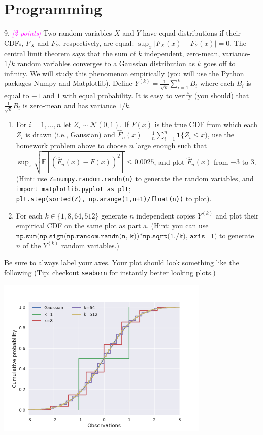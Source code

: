 \documentclass{article}
\newcommand{\1}{\mathbf{1}}
\newcommand{\E}{\mathbb{E}}
\newcommand{\grade}[1]{\small\textcolor{magenta}{\emph{[#1 points]}} \normalsize}
\begin{document}
{\color{blue}

\section{Programming}

9. \grade{2} Two random variables $X$ and $Y$ have equal distributions if their CDFs, $F_X$ and $F_Y$, respectively, are equal: $\sup_{x} |F_X(x) - F_Y(x)| = 0$. 
The central limit theorem says that the sum of $k$ independent, zero-mean, variance-$1/k$ random variables converges to a Gaussian distribution as $k$ goes off to infinity.  
We will study this phenomenon empirically (you will use the Python packages Numpy and Matplotlib). 
Define $Y^{(k)} = \frac{1}{\sqrt{k}} \sum_{i=1}^k B_i$ where each $B_i$ is equal to $-1$ and $1$ with equal probability.
It is easy to verify (you should) that $\frac{1}{\sqrt{k}} B_i$ is zero-mean and has variance $1/k$.
\begin{enumerate}
	\item For $i=1,\dots,n$ let $Z_i \sim \mathcal{N}(0,1)$. If $F(x)$ is the true CDF from which each $Z_i$ is drawn (i.e., Gaussian) and $\widehat{F}_n(x) = \frac{1}{n} \sum_{i=1}^n \1\{ Z_i \leq x)$, use the homework problem above to choose $n$ large enough such that $\sup_x \sqrt{\E[ (\widehat{F}_n(x)-F(x))^2 ]} \leq 0.0025$, and plot $\widehat{F}_n(x)$ from $-3$ to $3$. (Hint: use \texttt{Z=numpy.random.randn(n)} to generate the random variables, and \texttt{import matplotlib.pyplot as plt};\\ \texttt{plt.step(sorted(Z), np.arange(1,n+1)/float(n))} to plot).
	\item For each $k \in \{1, 8, 64, 512\}$ generate $n$ independent copies $Y^{(k)}$ and plot their empirical CDF on the same plot as part a. (Hint: you can use $\texttt{np.sum(np.sign(np.random.randn(n, k))*np.sqrt(1./k), axis=1)}$ to generate $n$ of the $Y^{(k)}$ random variables.)
\end{enumerate}
Be sure to always label your axes. 
Your plot should look something like the following (Tip: checkout \texttt{seaborn} for instantly better looking plots.)
}

\newpage

\includegraphics[width=4in]{problem9.png}


\end{document}
